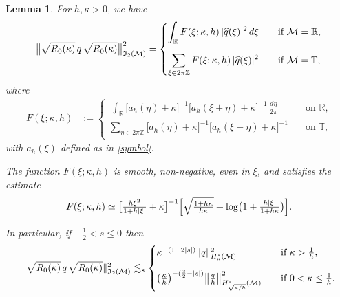 \documentclass{amsart}
\newcommand{\R}{{\mathbb{R}}}
\newcommand{\T}{{\mathbb{T}}}
\newcommand{\Z}{{\mathbb{Z}}}
\newtheorem{lemma}[theorem]{Lemma}
\theoremstyle{definition}
\theoremstyle{remark}
\begin{document}
\begin{lemma}\label{L:HS}
For $h,\kappa>0$, we have
\begin{align}\label{I2}
 \bigl\| \sqrt{R_0(\kappa)}\, q\, \sqrt{R_0(\kappa)} \bigr\|_{\mathfrak I_2(\mathcal M)}^2
 = \begin{cases}\displaystyle\int_{\R}  F(\xi;\kappa,h)\, |\widehat q(\xi)|^2\,d\xi &\quad\text{if \(\mathcal M = \R\),}\vspace{1em}\\ \displaystyle\sum_{\xi\in2\pi\Z} F(\xi;\kappa,h)\, |\widehat q(\xi)|^2&\quad\text{if \(\mathcal M = \T\),}\end{cases}
\end{align}
where 
\begin{align}\label{F defn}
 F(\xi;\kappa,h) &:= \begin{cases}
 	\displaystyle\ \int_{\R} \bigl[a_h(\eta) +\kappa\bigr]^{-1}\bigl[a_h(\xi+\eta) + \kappa\bigr]^{-1} \,\tfrac{d\eta}{2\pi}  & \quad\text{on $\R$,}\\[2ex]
	\displaystyle\sum_{\eta\in2\pi\Z} \bigl[a_h(\eta) +\kappa\bigr]^{-1}\bigl[a_h(\xi+\eta) + \kappa\bigr]^{-1} & \quad\text{on $\T$,}
\end{cases}
\end{align}
with \(a_h(\xi)\) defined as in \eqref{symbol}.

The function \(F(\xi;\kappa,h)\) is smooth, non-negative, even in \(\xi\), and satisfies the estimate
\begin{equation}\label{F main bound}
F(\xi;\kappa,h)\simeq \bigl[\tfrac{h\xi^2}{1+h|\xi|} +\kappa\bigr]^{-1}\Bigl[\sqrt{\tfrac{1+h\kappa}{h\kappa}} + \log\bigl(1 + \tfrac{h|\xi|}{1+h\kappa}\bigr)\Bigr].
\end{equation} 

In particular, if $-\frac12<s\leq 0$ then
\begin{align}\label{HS bdd}
 \| \sqrt{R_0(\kappa)}\, q\, \sqrt{R_0(\kappa)}\|_{\mathfrak I_2(\mathcal M)}^2 \lesssim_s\begin{cases} \kappa^{-(1-2|s|)} \|q\|_{H^s_\kappa(\mathcal M)}^2&\quad\text{if \(\kappa>\tfrac1h\),}\vspace{1em}\\\bigl(\tfrac \kappa h\bigr)^{-(\frac32-|s|)}\bigl\|\tfrac qh\bigr\|_{H_{\sqrt{\kappa/h}}^s(\mathcal M)}^2&\quad\text{if \(0<\kappa\leq\tfrac1h\).}\end{cases}
\end{align}


\end{lemma}
\end{document}
